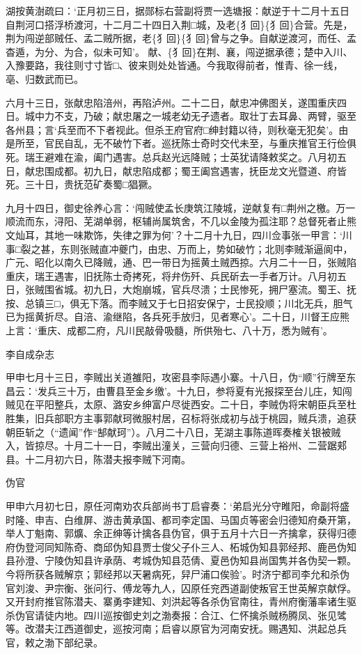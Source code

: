 \documentclass[]{article}
\begin{document}
湖按黄澍疏曰：`正月初三日，据郧标右营副将贾一选塘报：献逆于十二月十五日自荆河口搭浮桥渡河，十二月二十四日入荆□城，及老\{犭回\}\{犭回\}合营。先是，荆为闯逆部贼任、孟二贼所据，老\{犭回\}\{犭回\}曾与之争。自献逆渡河，而任、孟杳遁，为分、为合，似未可知'。
献、\{犭回\}在荆、襄，闯逆据承德；楚中入川、入豫要路，我往则寸寸皆□、彼来则处处皆通。今我取得前者，惟青、徐一线，亳、归数武而已。

六月十三日，张献忠陷涪州，再陷泸州。二十二日，献忠冲佛图关，遂围重庆四日。城中力不支，乃破；献忠屠之一城老幼无孑遗者。取壮丁去耳鼻、两臂，驱至各州县；言`兵至而不下者视此。但杀王府官府□绅封籍以待，则秋毫无犯矣'。由是所至，官民自乱，无不破竹下者。巡抚陈士奇时交代未至，与重庆推官王行俭俱死。瑞王避难在渝，阖门遇害。总兵赵光远降贼；士英犹请降敕奖之。八月初五日，献忠围成都。初九日，献忠陷成都；蜀王阖宫遇害，抚臣龙文光暨道、府皆死。三十日，贵抚范矿奏蜀□猖獗。

九月十四日，御史徐养心言：`闯贼使孟长庚筑江陵城，逆献复有□荆州之檄。万一顺流而东，浔阳、芜湖单弱，枢辅尚属筑舍，不几以金陵为孤注耶？总督死者止熊文灿耳，其地一味欺饰，失律之罪为何'？十二月十九日，四川佥事张一甲言：`川事□裂之甚，东则张贼直冲夔门，由忠、万而上，势如破竹；北则李贼渐逼阆中，广元、昭化以南久已降贼，通、巴一带日为摇黄土贼西掠。六月二十一日，张贼陷重庆，瑞王遇害，旧抚陈士奇拷死，将弁伤歼、兵民斫去一手者万计。八月初五日，张贼围省城。初九日，大炮崩城，官兵尽溃；士民惨死，拥尸塞流。蜀王、抚按、总镇三□，俱无下落。而李贼又于七日招安保宁，士民投顺；川北无兵，胆气已为摇黄折尽。自涪、渝继陷，各兵死手放归，见者寒心'。二十日，川督王应熊上言：`重庆、成都二府，凡川民敲骨吸髓，所供殆七、八十万，悉为贼有'。

李自成杂志

甲申七月十三日，李贼出关道雒阳，攻密县李际遇小寨。十八日，伪``顺''行牌至东昌云：`发兵三十万，由曹县至金乡缴'。十九日，参将夏有光报探至台儿庄，知闯贼见在平阳整兵，太原、潞安乡绅富户尽徙西安。二十日，李贼伪将宋朝臣兵至杜胜集，旧兵部职方主事郭献珂微服村居，召标将张成初与战于桃园，贼兵溃，追获朝臣斩之（``遗闻''作``郜献珂''）。八月二十八日，芜湖主事陈道晖奏榷关银被贼入，皆掠尽。十月二十一日，李贼出潼关，三营向归德、三营上裕州、二营踞郏县。十二月初六日，陈潜夫报李贼下河南。

伪官

甲申六月初七日，原任河南劝农兵部尚书丁启睿奏：`弟启光分守睢阳，命副将盛时隆、申吉、白维屏、游击黄承国、都司李定国、马国贞等密会归德知府桑开第，举人丁魁南、郭爌、余正绅等计擒各县伪官，俱于五月十六日一齐擒拿，获得归德府伪登河同知陈奇、商邱伪知县贾士俊父子仆三人、柘城伪知县郭经邦、鹿邑伪知县孙澄、宁陵伪知县许承荫、考城伪知县范倩、夏邑伪知县尚国隽并各伪契一颗。今将所获各贼解京；郭经邦以天暑病死，舁尸浦口俟验'。时济宁都司李允和杀伪官刘浚、尹宗衡、张问行、傅龙等九人，囚原任兖西道副使叛官王世英解京献俘。又开封府推官陈潜夫、寨勇李建知、刘洪起等各杀伪官南往，青州府衡藩率诸生驱杀伪官请徒内地。四川巡按御史刘之渤奏报：合江、仁怀擒杀贼杨腾凤、张见骘等。改潜夫江西道御史，巡按河南；启睿以原官为河南安抚。赐遇知、洪起总兵官，敕之渤下部纪录。
\end{document}
